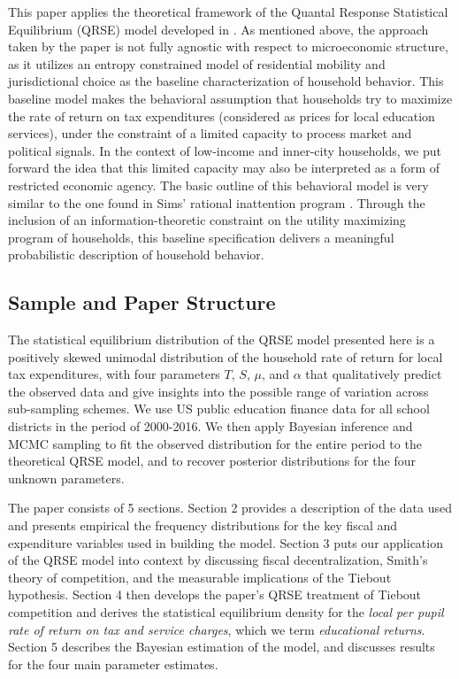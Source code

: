 This paper applies the theoretical framework of the Quantal Response
Statistical Equilibrium (QRSE) model developed in \citet{schafol}. As
mentioned above, the approach taken by the paper is not fully agnostic
with respect to microeconomic structure, as it utilizes an entropy
constrained model of residential mobility and jurisdictional choice as
the baseline characterization of household behavior. This baseline
model makes the behavioral assumption that households try to maximize
the rate of return on tax expenditures (considered as prices for local
education services), under the constraint of a limited capacity to
process market and political signals. In the context of low-income and
inner-city households, we put forward the idea that this limited
capacity may also be interpreted as a form of restricted economic
agency. The basic outline of this behavioral model is very similar to
the one found in Sims' rational inattention program
\citep{sims_implications_2003}.  Through the inclusion
of an information-theoretic constraint on the utility maximizing program of
households, this baseline specification delivers a meaningful
probabilistic description of household behavior.

\subsection{Sample and Paper Structure}
\label{sec-1-3}

The statistical equilibrium distribution of the QRSE model presented
here is a positively skewed unimodal distribution of the household
rate of return for local tax expenditures, with four parameters $T$,
$S$, $\mu$, and $\alpha$ that qualitatively predict the observed
data and give insights into the possible range of variation across
sub-sampling schemes. We use US public education finance data for all school districts
in the period of 2000-2016. We then apply Bayesian inference and MCMC sampling to fit the observed
distribution for the entire period to the theoretical QRSE model, and to recover posterior
distributions for the four unknown parameters.

The paper consists of 5 sections. Section 2 provides a description of
the data used and presents empirical the frequency distributions for the
key fiscal and expenditure variables used in building the
model. Section 3 puts our application of the QRSE model into context
by discussing fiscal decentralization, Smith's theory of
competition, and the measurable implications of the Tiebout
hypothesis. Section 4 then develops the paper's QRSE treatment of
Tiebout competition and derives the statistical equilibrium density
for the \emph{local per pupil rate of return on tax and service charges},
which we term \emph{educational returns}.  Section 5 describes the
Bayesian estimation of the model, and discusses results for the four
main parameter estimates.




